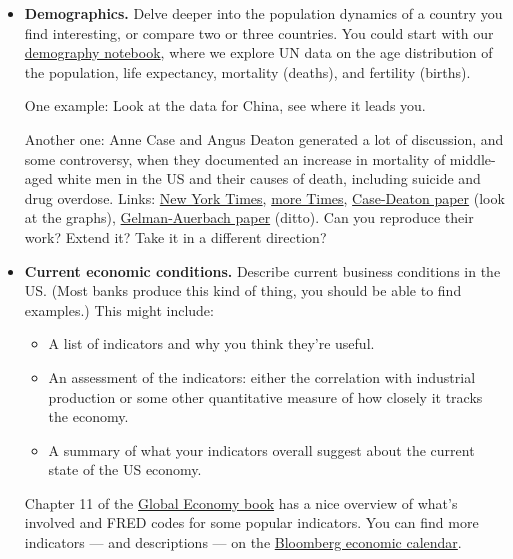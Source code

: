 \documentclass[11pt]{article}
\begin{document}
\begin{itemize}
\item {\bf Demographics.\/} Delve deeper into the population dynamics of a country
you find interesting, or compare two or three countries.
You could start with our
\href{https://github.com/NYUDataBootcamp/Materials/blob/master/Code/Lab/UN_demography.ipynb}
{demography notebook},
where we explore UN data on
the age distribution of the population, life expectancy, mortality (deaths), and fertility (births).

One example:  Look at the data for China, see where it leads you.

Another one:  Anne Case and Angus Deaton generated a lot of discussion,
and some controversy, when they documented an increase in mortality of middle-aged white men in the US
and their causes of death, including suicide and drug overdose.
Links:
\href{http://www.nytimes.com/2015/11/03/health/death-rates-rising-for-middle-aged-white-americans-study-finds.html}
    {New York Times},
\href{http://www.nytimes.com/2015/11/07/upshot/more-details-on-rising-mortality-among-middle-aged-whites.html}
    {more Times},
\href{http://www.pnas.org/content/112/49/15078.full.pdf}{Case-Deaton paper} (look at the graphs),
\href{http://andrewgelman.com/wp-content/uploads/2017/04/ageadj.pdf}{Gelman-Auerbach paper} (ditto).
Can you reproduce their work?  Extend it?  Take it in a different direction?

\item {\bf Current economic conditions.\/}  Describe current business conditions in the US.
(Most banks produce this kind of thing, you should be able to find examples.)
This might include:
\begin{itemize}
\item A list of indicators and why you think they're useful.
\item An assessment of the indicators:  either the correlation with industrial production
or some other quantitative measure of how closely it tracks the economy.
\item A summary of what your indicators overall suggest about the current state
of the US economy.
\end{itemize}
Chapter 11 of the \href{(http://www.stern.nyu.edu/experience-stern/about/departments-centers-initiatives/centers-of-research/global-economy-business/development-initiatives/global-economy-course}
{Global Economy book} has a nice overview of what's involved
and FRED codes for some popular indicators.
You can find more indicators --- and descriptions ---
on the
\href{http://www.bloomberg.com/markets/economic-calendar}{Bloomberg economic calendar}.


\end{itemize}
\end{document}
